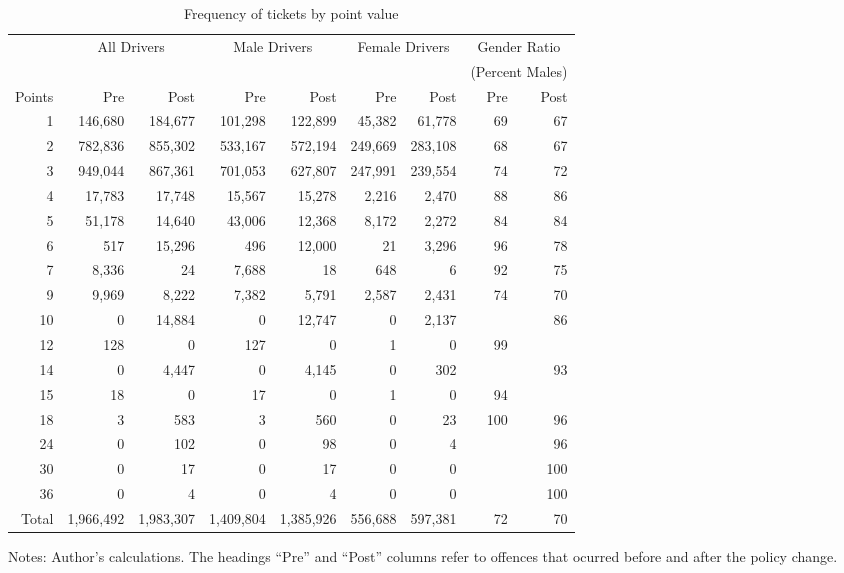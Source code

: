 
\begin{table}%
\centering
\begin{tabular}{r r r r r r r r r}
  \hline
		& \multicolumn{2}{c}{All Drivers} 	& \multicolumn{2}{c}{Male Drivers} 	&  \multicolumn{2}{c}{Female Drivers} &  \multicolumn{2}{c}{Gender Ratio} \\
 & & & & & & & \multicolumn{2}{c}{(Percent Males)} \\

 \cmidrule(lr){2-3}\cmidrule(lr){4-5}\cmidrule(lr){6-7} 
Points 	& Pre 			& Post			& Pre 		& Post		& Pre 		& Post		& Pre 	& Post		\\ 
  \hline
1		& 146,680		& 184,677		& 101,298 	& 122,899	&  45,382 	&   61,778 	& 69 	& 67 \\ 
2		& 782,836		& 855,302		& 533,167 	& 572,194	& 249,669 	& 283,108 	& 68 	& 67 \\ 
3		& 949,044		& 867,361		& 701,053 	& 627,807	& 247,991	& 239,554	& 74 	& 72 \\ 
4		& 17,783		& 17,748		&  15,567 	&  15,278 	&    2,216 	&    2,470 	& 88 	& 86 \\ 
5		& 51,178		& 14,640		&  43,006 	&  12,368 	&    8,172 	&    2,272 	& 84 	& 84 \\ 
6		& 517			& 15,296		&     496 	&  12,000 	&        21 	&    3,296 	& 96 	& 78 \\ 
7		& 8,336		& 24			&   7,688 	&        18 	&      648 	&          6 	& 92 	& 75 \\ 
9		& 9,969		& 8,222		&   7,382 	&    5,791 	&    2,587 	&    2,431 	& 74 	& 70 \\ 
10		& 0				& 14,884		&         0 	&  12,747 	&         0 	&    2,137 	&  		& 86 \\ 
12		& 128			& 0				&     127	&         0 	&         1 	&         0 	& 99 	&  \\ 
14		& 0				& 4,447		&       0 	&   4,145 	&         0 	&      302 	&  		& 93 \\ 
15		& 18			& 0				&      17 	&         0 	&         1 	&         0 	& 94 	&  \\ 
18		& 3				& 583			&       3 	&      560 	&         0 	&        23 	& 100 	& 96 \\ 
24		& 0				& 102			&       0 	&       98 	&         0 	&         4 	&  		& 96 \\ 
30		& 0				& 17			&       0 	&       17 	&         0 	&         0 	&  		& 100 \\ 
36		& 0				& 4				&       0 	&        4 	&         0 	&         0 	&  		& 100 \\ 

   \hline

Total 	& 1,966,492 	& 1,983,307 	& 1,409,804 & 1,385,926 & 556,688 & 597,381 & 72 & 70 \\ 

   \hline
\end{tabular}
\caption{Frequency of tickets by point value} 
Notes: Author’s calculations. The headings ``Pre'' and ``Post'' columns refer to offences that ocurred before and after the policy change.
\label{tab:penalties}
\end{table}